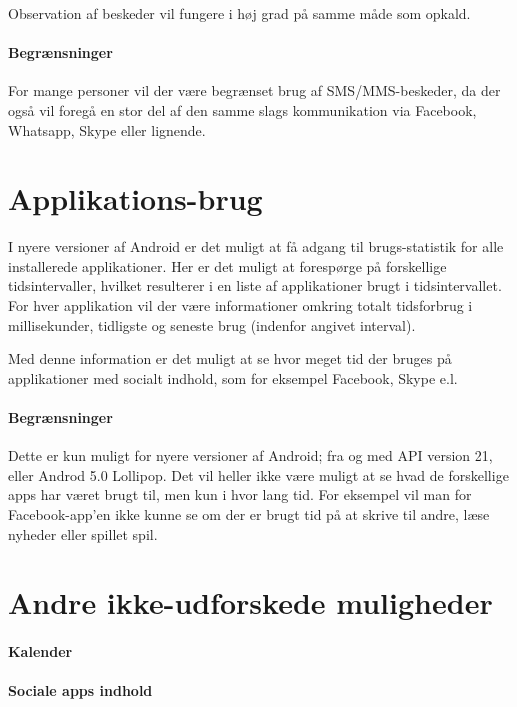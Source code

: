 Observation af beskeder vil fungere i høj grad på samme måde som opkald.

\paragraph{Begrænsninger}
For mange personer vil der være begrænset brug af SMS/MMS-beskeder, da der også vil foregå en stor del af den samme slags kommunikation via Facebook, Whatsapp, Skype eller lignende.

\section{Applikations-brug}
I nyere versioner af Android er det muligt at få adgang til brugs-statistik for alle installerede applikationer.
Her er det muligt at forespørge på forskellige tidsintervaller, hvilket resulterer i en liste af applikationer brugt i tidsintervallet.
For hver applikation vil der være informationer omkring totalt tidsforbrug i millisekunder, tidligste og seneste brug (indenfor angivet interval).

Med denne information er det muligt at se hvor meget tid der bruges på applikationer med socialt indhold, som for eksempel Facebook, Skype e.l.

\paragraph{Begrænsninger}
Dette er kun muligt for nyere versioner af Android; fra og med API version 21, eller Androd 5.0 Lollipop.
Det vil heller ikke være muligt at se hvad de forskellige apps har været brugt til, men kun i hvor lang tid.
For eksempel vil man for Facebook-app'en ikke kunne se om der er brugt tid på at skrive til andre, læse nyheder eller spillet spil.

\section{Andre ikke-udforskede muligheder}

\paragraph{Kalender}

\paragraph{Sociale apps indhold}
